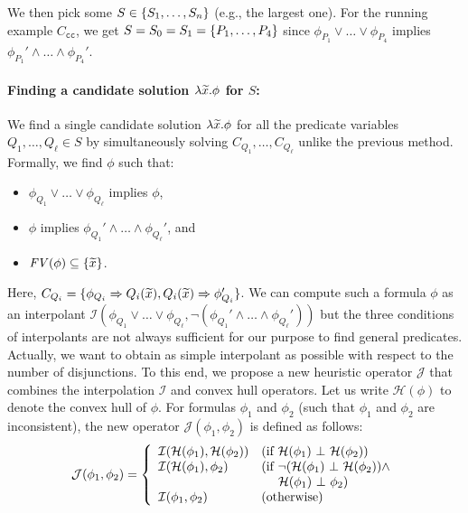 We then pick some \(S \in \{{S_1,\dots,S_n}\}\) (e.g., the largest one).
 For the running example \(C_{\texttt{cc}}\), we get
\(S=S_0=S_1=\{{P_1,\dots,P_4}\}\) since \(\phi_{P_1} \lor \dots
\lor\phi_{P_4}\) implies \(\phi_{P_1}' \land \dots \land \phi_{P_4}'\).

\paragraph{Finding a candidate solution \(\lambda \widetilde{x}.\phi\) for \(S\):}
We find a single candidate solution \(\lambda \widetilde{x}.\phi\) for all the
predicate variables \(Q_1,\dots,Q_{\ell} \in S\) by simultaneously
solving \(C_{Q_1},\dots,C_{Q_{\ell}}\) unlike the previous method.
Formally, we find \(\phi\) such that:
\vspace{-5pt}
\begin{itemize}
\item \(\phi_{Q_1} \lor \dots \lor \phi_{Q_{\ell}}\) implies \(\phi\),
\item \(\phi\) implies \(\phi_{Q_1}' \land \dots \land \phi_{Q_{\ell}}'\), and
\item \(\mathit{FV}({\phi}) \subseteq \{{\widetilde{x}}\}\).
\end{itemize}
Here, \(C_{Q_i}=\{{\phi_{Q_i} \Rightarrow Q_i(\widetilde{x}),Q_i(\widetilde{x}) \Rightarrow
\phi_{Q_i}'}\}\).  We can compute such a formula \(\phi\) as an
interpolant \(\mathcal{I}(\phi_{Q_1} \lor \dots \lor
\phi_{Q_{\ell}},\neg (\phi_{Q_1}' \land \dots \land \phi_{Q_{\ell}}'))\)
but the three conditions of interpolants are not always sufficient for
our purpose to find general predicates.  Actually, we want to obtain as
simple interpolant as possible with respect to the number of
disjunctions.
To this end, we propose a new heuristic operator \(\mathcal{J}\) that
combines the interpolation \(\mathcal{I}\) and convex hull operators.
Let us write \(\mathcal{H}(\phi)\) to denote the convex hull of \(\phi\).
 For formulas \(\phi_1\) and \(\phi_2\) (such that \(\phi_1\) and
\(\phi_2\) are inconsistent), the new operator
\(\mathcal{J}(\phi_1,\phi_2)\) is defined as follows:
\[
\mathcal{J}(\phi_1,\phi_2) =
\left\{
\begin{array}{ll}
\mathcal{I}(\mathcal{H}(\phi_1),\mathcal{H}(\phi_2)) & (\mbox{if~}\mathcal{H}(\phi_1) \ \bot\  \mathcal{H}(\phi_2)) \\
\mathcal{I}(\mathcal{H}(\phi_1),\phi_2) & (\mbox{if~}\neg (\mathcal{H}(\phi_1) \ \bot\  \mathcal{H}(\phi_2)) \land \\
&\ \quad \mathcal{H}(\phi_1) \ \bot\  \phi_2) \\
\mathcal{I}(\phi_1,\phi_2) & (\mbox{otherwise})
\end{array}
\right.
\]
